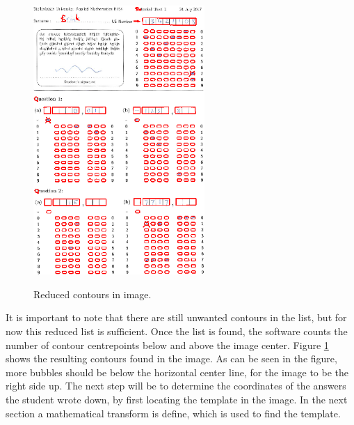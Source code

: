 \begin{figure}[h]
  \centering
  \includegraphics[width=6.5cm]{Reduced}\\
  \caption{Reduced contours in image.}
  \label{fig:reduced}
\end{figure}

It is important to note that there are still unwanted contours in the list, but for now this reduced list is sufficient. Once the list is found, the software counts the number of contour centrepoints below and above the image center. Figure \ref{fig:reduced} shows the resulting contours found in the image. As can be seen in the figure, more bubbles should be below the horizontal center line, for the image to be the right side up. The next step will be to determine the coordinates of the answers the student wrote down, by first locating the template in the image. In the next section a mathematical transform is define, which is used to find the template.

